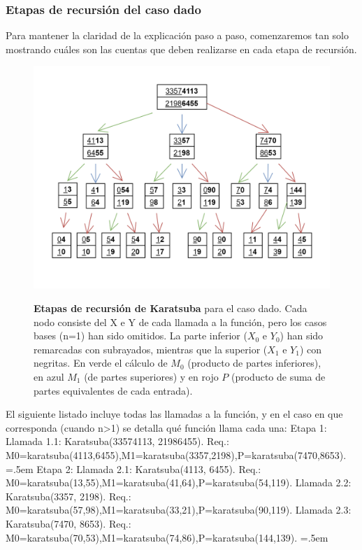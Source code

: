\documentclass[titlepage,a4paper]{article}
\newenvironment{lcverbatim}
 {\SaveVerbatim{cverb}}
 {\endSaveVerbatim
  \flushleft\fboxrule=0pt\fboxsep=.5em
  \colorbox{cverbbg}{%
    \makebox[\dimexpr\linewidth-2\fboxsep][l]{\BUseVerbatim{cverb}}%
  }
  \endflushleft
}
\begin{document}
\subsubsection{Etapas de recursión del caso dado}
Para mantener la claridad de la explicación paso a paso, comenzaremos tan solo mostrando cuáles son las cuentas que deben realizarse en cada etapa de recursión.

\begin{figure}[H]
\centering
\includegraphics[width=\textwidth]{Karatsuba106713.drawio.png}
\caption{\label{fig:etapas}}\textbf{Etapas de recursión de Karatsuba} para el caso dado. Cada nodo consiste del X e Y de cada llamada a la función, pero los casos bases (n=1) han sido omitidos. La parte inferior ($X_0$ e $Y_0$) han sido remarcadas con subrayados, mientras que la superior ($X_1$ e $Y_1$) con negritas. En verde el cálculo de $M_0$ (producto de partes inferiores), en azul $M_1$ (de partes superiores) y en rojo $P$ (producto de suma de partes equivalentes de cada entrada).
\end{figure}
El siguiente listado incluye todas las llamadas a la función, y en el caso en que corresponda (cuando n>1) se detalla qué función llama cada una:
\begin{lcverbatim}
Etapa 1:
	Llamada 1.1: Karatsuba(33574113, 21986455). Req.:
		M0=karatsuba(4113,6455),M1=karatsuba(3357,2198),P=karatsuba(7470,8653).
\end{lcverbatim}
\begin{lcverbatim}
Etapa 2:
	Llamada 2.1: Karatsuba(4113, 6455). Req.:
		M0=karatsuba(13,55),M1=karatsuba(41,64),P=karatsuba(54,119).
	Llamada 2.2: Karatsuba(3357, 2198). Req.:
		M0=karatsuba(57,98),M1=karatsuba(33,21),P=karatsuba(90,119).
	Llamada 2.3: Karatsuba(7470, 8653). Req.:
		M0=karatsuba(70,53),M1=karatsuba(74,86),P=karatsuba(144,139).
\end{lcverbatim}
\end{document}
